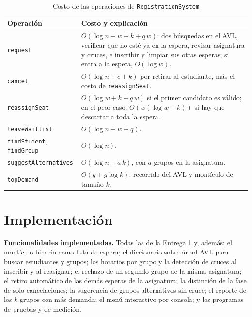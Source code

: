 \documentclass[conference]{IEEEtran}
\begin{document}
\begin{table}[htbp]
\caption{Costo de las operaciones de \texttt{RegistrationSystem}}
\label{tab:ops}
\centering
\footnotesize
\begin{tabular}{@{}p{2.2cm} p{5.6cm}@{}}
\toprule
\textbf{Operación} & \textbf{Costo y explicación} \\
\midrule
\texttt{request} & $O(\log n + w + k + q\,w)$: dos búsquedas en el AVL, verificar que no esté ya en la espera, revisar asignatura y cruces, e inscribir y limpiar sus otras esperas; si entra a la espera, $O(\log w)$. \\
\texttt{cancel} & $O(\log n + c + k)$ por retirar al estudiante, más el costo de \texttt{reassignSeat}. \\
\texttt{reassignSeat} & $O(\log w + k + q\,w)$ si el primer candidato es válido; en el peor caso, $O(w(\log w + k))$ si hay que descartar a toda la espera. \\
\texttt{leaveWaitlist} & $O(\log n + w + q)$. \\
\texttt{findStudent}, \texttt{findGroup} & $O(\log n)$. \\
\texttt{suggest\-Alternatives} & $O(\log n + a\,k)$, con $a$ grupos en la asignatura. \\
\texttt{topDemand} & $O(g + g \log k)$: recorrido del AVL y montículo de tamaño $k$. \\
\bottomrule
\end{tabular}
\end{table}


\section{Implementación}

\textbf{Funcionalidades implementadas.} Todas las de la Entrega 1 y, además: el montículo binario como lista de espera; el diccionario sobre árbol AVL para buscar estudiantes y grupos; los horarios por grupo y la detección de cruces al inscribir y al reasignar; el rechazo de un segundo grupo de la misma asignatura; el retiro automático de las demás esperas de la asignatura; la distinción de la fase de solo cancelaciones; la sugerencia de grupos alternativos sin cruce; el reporte de los $k$ grupos con más demanda; el menú interactivo por consola; y los programas de pruebas y de medición.
\end{document}
